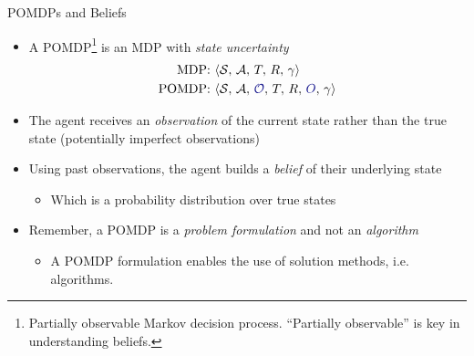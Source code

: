 \begin{frame}[fragile]{POMDPs and Beliefs}

\begin{itemize}
    \item A POMDP\footnote{Partially observable Markov decision process. ``Partially observable'' is key in understanding beliefs.} is an MDP with \textit{state uncertainty} \pause
    \begin{align*}
        \text{MDP: }& \langle \mathcal{S},\, \mathcal{A},\, T,\, R,\, \gamma \rangle \\
        \text{POMDP: }& \langle \mathcal{S},\, \mathcal{A},\, {\color{darkblue}\mathcal{O}},\, T,\, R,\, {\color{darkblue}O},\, \gamma \rangle
    \end{align*}
    \vspace*{-1.5\baselineskip}
    \pause \item The agent receives an \textit{observation} of the current state rather than the true state (potentially imperfect observations) \pause
    \item Using past observations, the agent builds a \textit{belief} of their underlying state \pause
    \begin{itemize}
        \item Which is a probability distribution over true states \pause
    \end{itemize}
    \item Remember, a POMDP is a \textcolor{cardinal}{\textit{problem formulation}} and not an \textcolor{cardinal}{\textit{algorithm}} \pause
    \begin{itemize}
        \item A POMDP formulation enables the use of solution methods, i.e. algorithms.
    \end{itemize}
\end{itemize}

\end{frame}